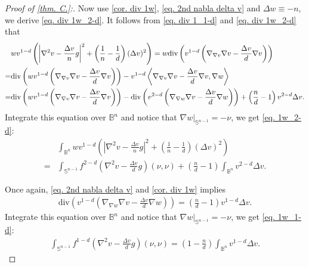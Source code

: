 \documentclass[12pt]{amsart}
\numberwithin{equation}{section}
\numberwithin{lemma}{section}
\numberwithin{proposition}{section}
\numberwithin{corollary}{section}
\numberwithin{remark}{section}
\begin{document}
\begin{proof}[Proof of \cref{thm. C.}:]
Now use \cref{cor. div 1w}, \cref{eq. 2nd nabla delta v} and $\Delta w\equiv-n$, we derive \cref{eq. div 1w_2-d}. It follows from \cref{eq. div 1_1-d} and \cref{eq. div 1w_2-d} that
\begin{align*}
        &wv^{1-d}\left(
        \left|\nabla^2 v-\frac{\Delta v}{n}g\right|^2
        +\left(\frac{1}{n}-\frac{1}{d}\right)(\Delta v)^2
        \right)
        =w\mathrm{div}\left(
        v^{1-d}
        \left(\nabla_{\nabla v}\nabla v-\frac{\Delta v}{d}\nabla v\right)
        \right)\notag\\
        =&\mathrm{div}\left(
        wv^{1-d}
        \left(\nabla_{\nabla v}\nabla v-\frac{\Delta v}{d}\nabla v\right)
        \right)
        -v^{1-d}
        \left\langle\nabla_{\nabla v}\nabla v-\frac{\Delta v}{d}\nabla v,\nabla w\right\rangle\notag\\
        =&\mathrm{div}\left(
        wv^{1-d}
        \left(\nabla_{\nabla v}\nabla v-\frac{\Delta v}{d}\nabla v\right)
        \right)
        -\mathrm{div}\left(
        v^{2-d}
        \left(\nabla_{\nabla w}\nabla v-\frac{\Delta v}{d}\nabla w\right)
        \right)
        +\left(\frac{n}{d}-1\right)v^{2-d}\Delta v.
    \end{align*}
    Integrate this equation over $\mathbb{B}^n$ and notice that $\nabla w|_{\mathbb{S}^{n-1}}=-\nu$, we get \cref{eq. 1w_2-d}:
    \begin{align*}
        &\int_{\mathbb{B}^n}wv^{1-d}\left(
        \left|\nabla^2 v-\frac{\Delta v}{n}g\right|^2
        +\left(\frac{1}{n}-\frac{1}{d}\right)(\Delta v)^2
        \right)\\
        =&\int_{\mathbb{S}^{n-1}}f^{2-d}
        \left(\nabla^2 v-\frac{\Delta v}{d}g\right)(\nu,\nu)
        +\left(\frac{n}{d}-1\right)
        \int_{\mathbb{B}^n}v^{2-d}\Delta v.
    \end{align*}

    Once again, \cref{eq. 2nd nabla delta v} and \cref{cor. div 1w} implies
    \begin{align*}
        \mathrm{div}\left(
        v^{1-d}
        \left(\nabla_{\nabla w}\nabla v-\frac{\Delta v}{d}\nabla w\right)
        \right)
        =\left(\frac{n}{d}-1\right)v^{1-d}\Delta v.
    \end{align*}
    Integrate this equation over $\mathbb{B}^n$ and notice that $\nabla w|_{\mathbb{S}^{n-1}}=-\nu$, we get \cref{eq. 1w_1-d}:
    \begin{align*}
        \int_{\mathbb{S}^{n-1}}f^{1-d}
        \left(\nabla^2 v-\frac{\Delta v}{d}g\right)(\nu,\nu)
        =\left(1-\frac{n}{d}\right)
        \int_{\mathbb{B}^n}v^{1-d}\Delta v.
    \end{align*}


\end{proof}
\end{document}
